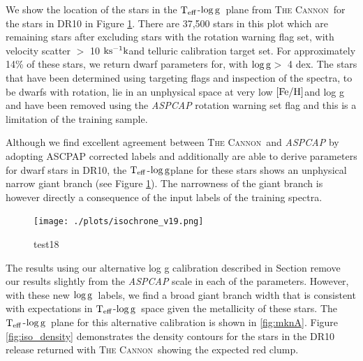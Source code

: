\documentclass[12pt, preprint]{aastex}
\newcommand{\sectionname}{Section}
\newcommand{\teff}{\mbox{$\rm T_{eff}$}}
\newcommand{\kms}{\mbox{$\rm ks^{-1} k$}}
\newcommand{\feh}{\mbox{$\rm [Fe/H]$}}
\newcommand{\logg}{\mbox{$\rm \log g$}}
\newcommand{\tc}{\textsc{The Cannon}}
\begin{document}
We show the location of the stars in the \teff-\logg\ plane from \tc\ for the stars in DR10 in Figure \ref{fig:test18}. There are 37,500 stars in this plot which are remaining stars after excluding stars with the  rotation warning flag set, with velocity scatter $>$ 10 \kms and telluric calibration target set. For approximately 14\% of these stars, we return dwarf parameters for, with \logg $>$ 4 dex.  The stars that have been determined using targeting flags and inspection of the spectra, to be dwarfs with rotation, lie in an unphysical space at very low \feh and log g and have been removed using the \textit{ASPCAP} rotation warning set flag and this is a limitation of the training sample. 

Although we find excellent agreement between \tc\ and \textit{ASPCAP} by adopting ASCPAP corrected labels and additionally are able to derive parameters for dwarf stars in DR10, the \teff-\logg plane for these stars shows an unphysical narrow giant branch  (see Figure \ref{fig:test18}). The narrowness of the giant branch is however directly a consequence of the input labels of the training spectra. 


\begin{figure}[h!]
  \texttt{[image: ./plots/isochrone\_v19.png]}
\caption{test18}
\label{fig:test18}
\end{figure}

The results using our alternative log g calibration described in \sectionname{} remove our results slightly from the \textit{ASPCAP} scale in each of the parameters. However, with these new \logg\ labels, we find a broad giant branch width that is consistent with expectations in \teff-\logg\ space given the metallicity of these stars. The \teff-\logg\ plane for this alternative calibration is shown in \ref{fig:mknA}. Figure \ref{fig:iso_density} demonstrates the density contours for the stars in the DR10 release returned with \tc\, showing the expected red clump. 

\end{document}
